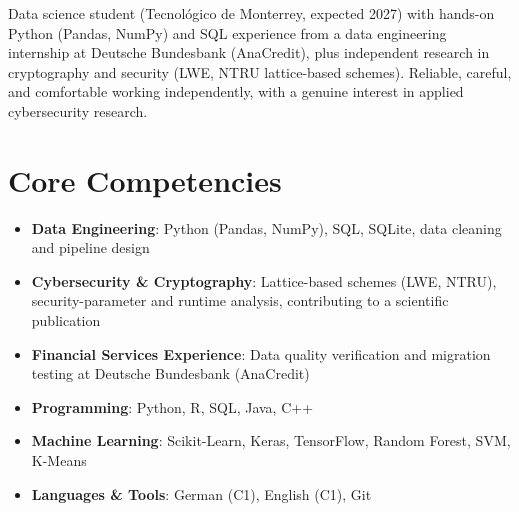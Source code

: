 \documentclass[11pt,a4paper,sans]{moderncv}
\begin{document}
\makecvtitle


\vspace{6pt}
\small{Data science student (Tecnológico de Monterrey, expected 2027) with hands-on Python (Pandas, NumPy) and SQL experience from a data engineering internship at Deutsche Bundesbank (AnaCredit), plus independent research in cryptography and security (LWE, NTRU lattice-based schemes). Reliable, careful, and comfortable working independently, with a genuine interest in applied cybersecurity research.}


\section{Core Competencies}
\vspace{1pt}
\begin{itemize}

\item \textbf{Data Engineering}: Python (Pandas, NumPy), SQL, SQLite, data cleaning and pipeline design

\item \textbf{Cybersecurity \& Cryptography}: Lattice-based schemes (LWE, NTRU), security-parameter and runtime analysis, contributing to a scientific publication

\item \textbf{Financial Services Experience}: Data quality verification and migration testing at Deutsche Bundesbank (AnaCredit)

\item \textbf{Programming}: Python, R, SQL, Java, C++

\item \textbf{Machine Learning}: Scikit-Learn, Keras, TensorFlow, Random Forest, SVM, K-Means

\item \textbf{Languages \& Tools}: German (C1), English (C1), Git

\end{itemize}

\end{document}
